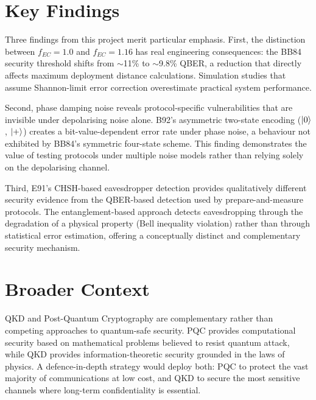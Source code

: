 \documentclass[10pt, a4paper]{report}
\begin{document}
\section{Key Findings}

Three findings from this project merit particular emphasis. First, the distinction between $f_{EC} = 1.0$ and $f_{EC} = 1.16$ has real engineering consequences: the BB84 security threshold shifts from $\sim$11\% to $\sim$9.8\% QBER, a reduction that directly affects maximum deployment distance calculations. Simulation studies that assume Shannon-limit error correction overestimate practical system performance.

Second, phase damping noise reveals protocol-specific vulnerabilities that are invisible under depolarising noise alone. B92's asymmetric two-state encoding ($\ket{0}$, $\ket{+}$) creates a bit-value-dependent error rate under phase noise, a behaviour not exhibited by BB84's symmetric four-state scheme. This finding demonstrates the value of testing protocols under multiple noise models rather than relying solely on the depolarising channel.

Third, E91's CHSH-based eavesdropper detection provides qualitatively different security evidence from the QBER-based detection used by prepare-and-measure protocols. The entanglement-based approach detects eavesdropping through the degradation of a physical property (Bell inequality violation) rather than through statistical error estimation, offering a conceptually distinct and complementary security mechanism.



\section{Broader Context}

QKD and Post-Quantum Cryptography are complementary rather than competing approaches to quantum-safe security. PQC provides computational security based on mathematical problems believed to resist quantum attack, while QKD provides information-theoretic security grounded in the laws of physics. A defence-in-depth strategy would deploy both: PQC to protect the vast majority of communications at low cost, and QKD to secure the most sensitive channels where long-term confidentiality is essential.
\end{document}
